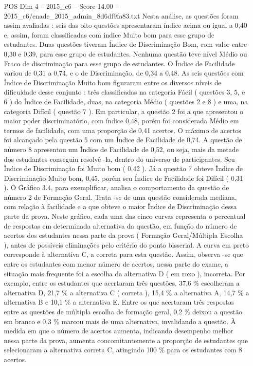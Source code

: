 \begin{textsample}{POS Dim 4 – 2015\_c6 – Score 14.00 – 2015\_c6/enade\_2015\_admin\_8d6df9fa83.txt}
Nesta análise, as questões foram assim avaliadas : seis das oito questões apresentaram índice acima ou igual a 0,40 e, assim, foram classificadas com índice Muito bom para esse grupo de estudantes.
Duas questões tiveram Índice de Discriminação Bom, com valor entre 0,30 e 0,39, para esse grupo de estudantes.
Nenhuma questão teve nível Médio ou Fraco de discriminação para esse grupo de estudantes.
O Índice de Facilidade variou de 0,31 a 0,74, e o de Discriminação, de 0,34 a 0,48.
As seis questões com Índice de Discriminação Muito bom figuraram entre os diversos níveis de dificuldade desse conjunto : três classificadas na categoria Fácil ( questões 3, 5, e 6 ) do Índice de Facilidade, duas, na categoria Médio ( questões 2 e 8 ) e uma, na categoria Difícil ( questão 7 ).
Em particular, a questão 2 foi a que apresentou o maior poder discriminatório, com índice 0,48, porém foi considerada Médio em termos de facilidade, com uma proporção de 0,41 acertos.
O máximo de acertos foi alcançado pela questão 5 com um Índice de Facilidade de 0,74.
A questão de número 8 apresentou um Índice de Facilidade de 0,52, ou seja, mais da metade dos estudantes conseguiu resolvê -la, dentro do universo de participantes.
Seu Índice de Discriminação foi Muito bom ( 0,42 ).
Já a questão 7 obteve Índice de Discriminação Muito bom, 0,45, porém seu Índice de Facilidade foi Difícil ( 0,31 ).
O Gráfico 3.4, para exemplificar, analisa o comportamento da questão de número 2 de Formação Geral.
Trata -se de uma questão considerada mediana, com relação à facilidade e a que obteve o maior Índice de Discriminação dessa parte da prova.
Neste gráfico, cada uma das cinco curvas representa o percentual de respostas em determinada alternativa da questão, em função do número de acertos dos estudantes nessa parte da prova ( Formação Geral/Múltipla Escolha ), antes de possíveis eliminações pelo critério do ponto bisserial.
A curva em preto corresponde à alternativa C, a correta para esta questão.
Assim, observa -se que entre os estudantes com menor número de acertos, nessa parte do exame, a situação mais frequente foi a escolha da alternativa D ( em roxo ), incorreta.
Por exemplo, entre os estudantes que acertaram três questões, 37,6 \% escolheram a alternativa D, 21,7 \% a alternativa C ( correta ), 15,4 \% a alternativa A, 14,7 \% a alternativa B e 10,1 \% a alternativa E.
Entre os que acertaram três respostas entre as questões de múltipla escolha de formação geral, 0,2 \% deixou a questão em branco e 0,3 \% marcou mais de uma alternativa, invalidando a questão.
À medida em que o número de acertos aumenta, indicando desempenho melhor nessa parte da prova, aumenta concomitantemente a proporção de estudantes que selecionaram a alternativa correta C, atingindo 100 \% para os estudantes com 8 acertos.

\end{textsample}

